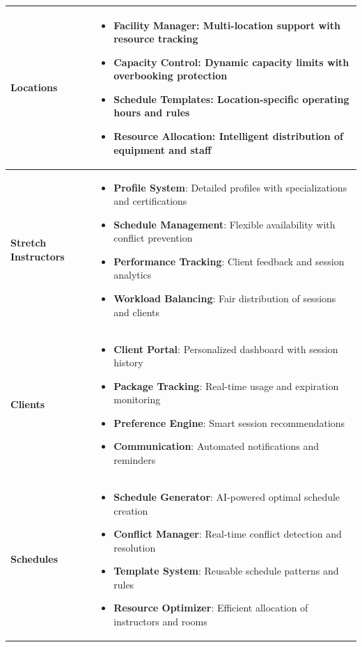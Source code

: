 \begin{center}
\begin{longtable}{p{}p{}}
    \textbf{Locations} & 
    \begin{itemize}[leftmargin=*]
        \item \textbf{Facility Manager}: Multi-location support with resource tracking
        \item \textbf{Capacity Control}: Dynamic capacity limits with overbooking protection
        \item \textbf{Schedule Templates}: Location-specific operating hours and rules
        \item \textbf{Resource Allocation}: Intelligent distribution of equipment and staff
    \end{itemize} \\
    \midrule
    
    \textbf{Stretch Instructors} & 
    \begin{itemize}[leftmargin=*]
        \item \textbf{Profile System}: Detailed profiles with specializations and certifications
        \item \textbf{Schedule Management}: Flexible availability with conflict prevention
        \item \textbf{Performance Tracking}: Client feedback and session analytics
        \item \textbf{Workload Balancing}: Fair distribution of sessions and clients
    \end{itemize} \\
    \midrule
    
    \textbf{Clients} & 
    \begin{itemize}[leftmargin=*]
        \item \textbf{Client Portal}: Personalized dashboard with session history
        \item \textbf{Package Tracking}: Real-time usage and expiration monitoring
        \item \textbf{Preference Engine}: Smart session recommendations
        \item \textbf{Communication}: Automated notifications and reminders
    \end{itemize} \\
    \midrule
    
    \textbf{Schedules} & 
    \begin{itemize}[leftmargin=*]
        \item \textbf{Schedule Generator}: AI-powered optimal schedule creation
        \item \textbf{Conflict Manager}: Real-time conflict detection and resolution
        \item \textbf{Template System}: Reusable schedule patterns and rules
        \item \textbf{Resource Optimizer}: Efficient allocation of instructors and rooms
    \end{itemize} \\
    \midrule
    

\end{longtable}
\end{center}
